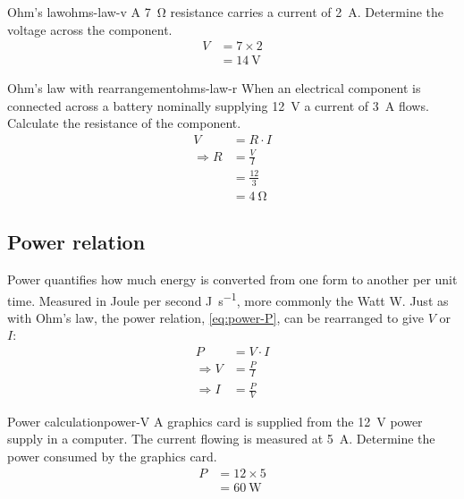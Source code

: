 \begin{example}{Ohm's law}{ohms-law-v}
  A \SI{7}{\ohm} resistance carries a current of \SI{2}{\ampere}.
  Determine the voltage across the component.
  \tcblower
  \begin{align}
    V & = 7 \times 2 \\
      & = \SI{14}{\volt}
  \end{align}
\end{example}

\begin{example}{Ohm's law with rearrangement}{ohms-law-r}
  When an electrical component is connected across a battery nominally supplying \SI{12}{\volt} a current of \SI{3}{\ampere} flows.
  Calculate the resistance of the component.
  \tcblower
  \begin{align}
    V & = R \cdot I \\
    \Rightarrow R & = \frac{V}{I} \\
      & = \frac{12}{3} \\
      & = \SI{4}{\ohm}
  \end{align}
\end{example}

\subsection{Power relation}
\label{sec:power-relation}

Power quantifies how much energy is converted from one form to another per unit time. Measured in Joule per second \si{\joule\per\second}, more commonly the Watt \si{\watt}.
Just as with Ohm's law, the power relation, \autoref{eq:power-P}, can be rearranged to give $V$ or $I$:
\begin{align}
  P & = V \cdot I \label{eq:power-P} \\
  \Rightarrow V & = \frac{P}{I} \label{eq:power-V} \\
  \Rightarrow I & = \frac{P}{V} \label{eq:power-I} 
\end{align}

\begin{example}{Power calculation}{power-V}
  A graphics card is supplied from the \SI{12}{\volt} power supply in a computer. The current flowing is measured at \SI{5}{\ampere}. Determine the power consumed by the graphics card.
  \tcblower
  \begin{align}
    P & = 12 \times 5 \\
      & = \SI{60}{\watt} 
  \end{align}
\end{example}

